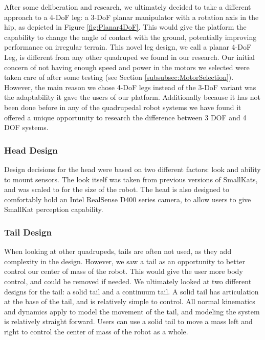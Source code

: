             After some deliberation and research, we ultimately decided to take a different approach to a 4-DoF leg: a 3-DoF planar manipulator with a rotation axis in the hip, as depicted in Figure \ref{fig:Planar4DoF}. This would give the platform the capability to change the angle of contact with the ground, potentially improving performance on irregular terrain. This novel leg design, we call a planar 4-DoF Leg, is different from any other quadruped we found in our research. Our initial concern of not having enough speed and power in the motors we selected were taken care of after some testing (see Section \ref{subsubsec:MotorSelection}). However, the main reason we chose 4-DoF legs instead of the 3-DoF variant was the adaptability it gave the users of our platform. Additionally because it has not been done before in any of the quadrupedal robot systems we have found it offered a unique opportunity to research the difference between 3 DOF and 4 DOF systems. 

            

        \subsubsection{Head Design}
            Design decisions for the head were based on two different factors: look and ability to mount sensors. The look itself was taken from previous versions of SmallKats, and was scaled to for the size of the robot. The head is also designed to comfortably hold an Intel RealSense D400 series camera, to allow users to give SmallKat perception capability.

        \subsubsection{Tail Design}
            When looking at other quadrupeds, tails are often not used, as they add complexity in the design. However, we saw a tail as an opportunity to better control our center of mass of the robot. This would give the user more body control, and could be removed if needed. We ultimately looked at two different designs for the tail: a solid tail and a continuum tail. A solid tail has articulation at the base of the tail, and is relatively simple to control. All normal kinematics and dynamics apply to model the movement of the tail, and modeling the system is relatively straight forward. Users can use a solid tail to move a mass left and right to control the center of mass of the robot as a whole.

